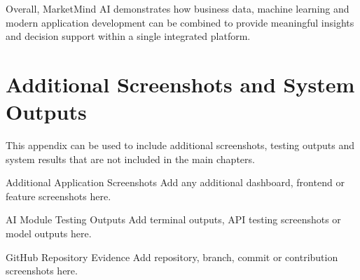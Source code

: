 \documentclass[12pt,a4paper]{report}
\begin{document}
Overall, MarketMind AI demonstrates how business data, machine learning
and modern application development can be combined to provide
meaningful insights and decision support within a single integrated
platform.



\appendix

\chapter{Additional Screenshots and System Outputs}

This appendix can be used to include additional screenshots, testing
outputs and system results that are not included in the main chapters.

\begin{screenshotplaceholder}{Additional Application Screenshots}
Add any additional dashboard, frontend or feature screenshots here.
\end{screenshotplaceholder}

\begin{screenshotplaceholder}{AI Module Testing Outputs}
Add terminal outputs, API testing screenshots or model outputs here.
\end{screenshotplaceholder}

\begin{screenshotplaceholder}{GitHub Repository Evidence}
Add repository, branch, commit or contribution screenshots here.
\end{screenshotplaceholder}


\end{document}

